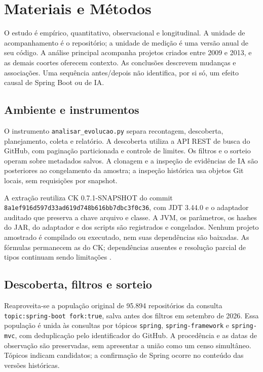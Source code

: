 \section{Materiais e Métodos}
\label{sec:metodologia}

O estudo é empírico, quantitativo, observacional e longitudinal. A unidade de acompanhamento é o repositório; a unidade de medição é uma versão anual de seu código. A análise principal acompanha projetos criados entre 2009 e 2013, e as demais coortes oferecem contexto. As conclusões descrevem mudanças e associações. Uma sequência antes/depois não identifica, por si só, um efeito causal de Spring Boot ou de IA.

\subsection{Ambiente e instrumentos}
\label{subsec:ambiente}

O instrumento \texttt{analisar\_evolucao.py} separa recontagem, descoberta, planejamento, coleta e relatório. A descoberta utiliza a API REST de busca do GitHub, com paginação particionada e controle de limites. Os filtros e o sorteio operam sobre metadados salvos. A clonagem e a inspeção de evidências de IA são posteriores ao congelamento da amostra; a inspeção histórica usa objetos Git locais, sem requisições por snapshot.

A extração reutiliza CK 0.7.1-SNAPSHOT do commit \texttt{8a1ef916d597d33ad619d748b616bb7dbc3f0c36}, com JDT 3.44.0 e o adaptador auditado que preserva a chave arquivo e classe. A JVM, os parâmetros, os hashes do JAR, do adaptador e dos scripts são registrados e congelados. Nenhum projeto amostrado é compilado ou executado, nem suas dependências são baixadas. As fórmulas permanecem as do CK; dependências ausentes e resolução parcial de tipos continuam sendo limitações \cite{aniche:ck,child:19}.

\subsection{Descoberta, filtros e sorteio}
\label{subsec:amostragem}

Reaproveita-se a população original de 95.894 repositórios da consulta \texttt{topic:spring-boot fork:true}, salva antes dos filtros em setembro de 2026. Essa população é unida às consultas por tópicos \texttt{spring}, \texttt{spring-framework} e \texttt{spring-mvc}, com deduplicação pelo identificador do GitHub. A procedência e as datas de observação são preservadas, sem apresentar a união como um censo simultâneo. Tópicos indicam candidatos; a confirmação de Spring ocorre no conteúdo das versões históricas.

